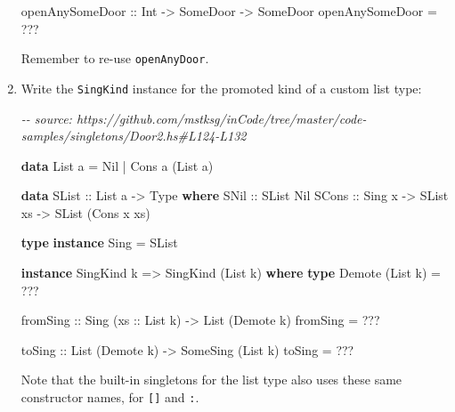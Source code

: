 \documentclass[]{article}
\newenvironment{Shaded}{}{}
\newcommand{\CommentTok}[1]{\textcolor[rgb]{0.38,0.63,0.69}{\textit{#1}}}
\newcommand{\DataTypeTok}[1]{\textcolor[rgb]{0.56,0.13,0.00}{#1}}
\newcommand{\KeywordTok}[1]{\textcolor[rgb]{0.00,0.44,0.13}{\textbf{#1}}}
\newcommand{\NormalTok}[1]{#1}
\newcommand{\OperatorTok}[1]{\textcolor[rgb]{0.40,0.40,0.40}{#1}}
\newcommand{\OtherTok}[1]{\textcolor[rgb]{0.00,0.44,0.13}{#1}}
\begin{document}
\begin{enumerate}
\begin{Shaded}
\begin{Highlighting}[]
\OtherTok{openAnySomeDoor ::} \DataTypeTok{Int} \OtherTok{{-}\textgreater{}} \DataTypeTok{SomeDoor} \OtherTok{{-}\textgreater{}} \DataTypeTok{SomeDoor}
\NormalTok{openAnySomeDoor }\OtherTok{=} \OperatorTok{???}
\end{Highlighting}
\end{Shaded}

  Remember to re-use \texttt{openAnyDoor}.
\item
  Write the \texttt{SingKind} instance for the promoted kind of a custom list
  type:

\begin{Shaded}
\begin{Highlighting}[]
\CommentTok{{-}{-} source: https://github.com/mstksg/inCode/tree/master/code{-}samples/singletons/Door2.hs\#L124{-}L132}

\KeywordTok{data} \DataTypeTok{List}\NormalTok{ a }\OtherTok{=} \DataTypeTok{Nil} \OperatorTok{|} \DataTypeTok{Cons}\NormalTok{ a (}\DataTypeTok{List}\NormalTok{ a)}

\KeywordTok{data} \DataTypeTok{SList}\OtherTok{ ::} \DataTypeTok{List}\NormalTok{ a }\OtherTok{{-}\textgreater{}} \DataTypeTok{Type} \KeywordTok{where}
    \DataTypeTok{SNil}\OtherTok{  ::} \DataTypeTok{SList} \DataTypeTok{\textquotesingle{}Nil}
    \DataTypeTok{SCons}\OtherTok{ ::} \DataTypeTok{Sing}\NormalTok{ x }\OtherTok{{-}\textgreater{}} \DataTypeTok{SList}\NormalTok{ xs }\OtherTok{{-}\textgreater{}} \DataTypeTok{SList}\NormalTok{ (}\DataTypeTok{\textquotesingle{}Cons}\NormalTok{ x xs)}

\KeywordTok{type} \KeywordTok{instance} \DataTypeTok{Sing} \OtherTok{=} \DataTypeTok{SList}

\KeywordTok{instance} \DataTypeTok{SingKind}\NormalTok{ k }\OtherTok{=\textgreater{}} \DataTypeTok{SingKind}\NormalTok{ (}\DataTypeTok{List}\NormalTok{ k) }\KeywordTok{where}
    \KeywordTok{type} \DataTypeTok{Demote}\NormalTok{ (}\DataTypeTok{List}\NormalTok{ k) }\OtherTok{=} \OperatorTok{???}

\OtherTok{    fromSing ::} \DataTypeTok{Sing}\NormalTok{ (}\OtherTok{xs ::} \DataTypeTok{List}\NormalTok{ k) }\OtherTok{{-}\textgreater{}} \DataTypeTok{List}\NormalTok{ (}\DataTypeTok{Demote}\NormalTok{ k)}
\NormalTok{    fromSing }\OtherTok{=} \OperatorTok{???}

\OtherTok{    toSing ::} \DataTypeTok{List}\NormalTok{ (}\DataTypeTok{Demote}\NormalTok{ k) }\OtherTok{{-}\textgreater{}} \DataTypeTok{SomeSing}\NormalTok{ (}\DataTypeTok{List}\NormalTok{ k)}
\NormalTok{    toSing }\OtherTok{=} \OperatorTok{???}
\end{Highlighting}
\end{Shaded}

  Note that the built-in singletons for the list type also uses these same
  constructor names, for \texttt{{[}{]}} and \texttt{:}.
\end{enumerate}
\end{document}
